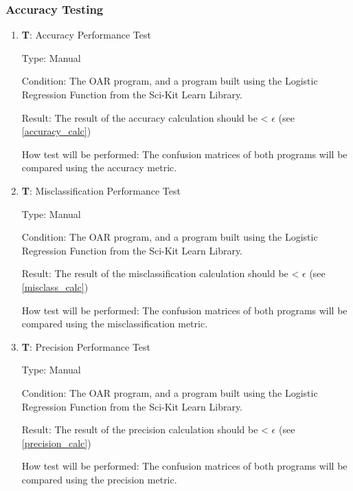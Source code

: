 \documentclass[12pt, titlepage]{article}
\newcounter{testnum} %
\begin{document}
\subsubsection{Accuracy Testing}

\begin{enumerate}

  \item{\textbf{T\thetestnum \label{T_accuracy}}: Accuracy Performance Test\\}

  Type: Manual
            
  Condition: The OAR program, and a program built
  using the Logistic Regression Function from the Sci-Kit Learn Library.
            
  Result: The result of the accuracy calculation should be < $\epsilon$ (see \ref{accuracy_calc})
            
  How test will be performed: The confusion matrices of both programs will be compared using the accuracy metric.

  \item{\textbf{T\thetestnum \label{T_misclass}}: Misclassification Performance Test\\}

  Type: Manual
            
  Condition: The OAR program, and a program built
  using the Logistic Regression Function from the Sci-Kit Learn Library.
            
  Result: The result of the misclassification calculation should be < $\epsilon$ (see \ref{misclass_calc})
            
  How test will be performed: The confusion matrices of both programs will be compared using the misclassification metric.

  \item{\textbf{T\thetestnum \label{T_precision}}: Precision Performance Test\\}

  Type: Manual
            
  Condition: The OAR program, and a program built
  using the Logistic Regression Function from the Sci-Kit Learn Library.
            
  Result: The result of the precision calculation should be < $\epsilon$ (see \ref{precision_calc})
            
  How test will be performed: The confusion matrices of both programs will be compared using the precision metric.
\end{enumerate} 
					
\end{document}
